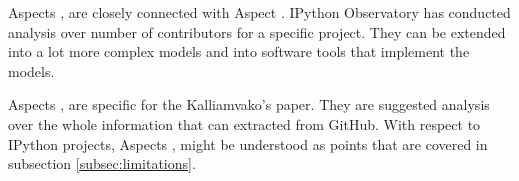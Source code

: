 Aspects ,  are closely connected with Aspect . IPython Observatory has conducted analysis over number of contributors for a specific project. They can be extended into a lot more complex models and into software tools that implement the models. 

Aspects ,  are specific for the Kalliamvako's paper\cite{kalliamvakoupromises}. They are suggested analysis over the whole information that can extracted from GitHub. With respect to IPython projects, Aspects ,  might be understood as points that are covered in subsection \ref{subsec:limitations}.





